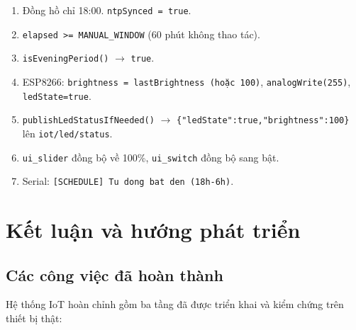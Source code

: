 \documentclass[13pt,a4paper]{article}
\newcommand{\code}[1]{\texttt{#1}}
\begin{document}
\begin{enumerate}[label=\arabic*., leftmargin=1.5cm]
    \item Đồng hồ chỉ 18:00. \code{ntpSynced = true}.
    \item \code{elapsed >= MANUAL\_WINDOW} (60 phút không thao tác).
    \item \code{isEveningPeriod()} $\rightarrow$ \code{true}.
    \item ESP8266: \code{brightness = lastBrightness (hoặc 100)}, \code{analogWrite(255)}, \code{ledState=true}.
    \item \code{publishLedStatusIfNeeded()} $\rightarrow$ \code{\{"ledState":true,"brightness":100\}} lên \code{iot/led/status}.
    \item \code{ui\_slider} đồng bộ về 100\%, \code{ui\_switch} đồng bộ sang bật.
    \item Serial: \code{[SCHEDULE] Tu dong bat den (18h-6h)}.
\end{enumerate}

\section{Kết luận và hướng phát triển}
\label{sec:ketluan}

\subsection{Các công việc đã hoàn thành}
\label{sec:hoanthanh}

Hệ thống IoT hoàn chỉnh gồm ba tầng đã được triển khai và kiểm chứng trên thiết bị thật:
\end{document}
